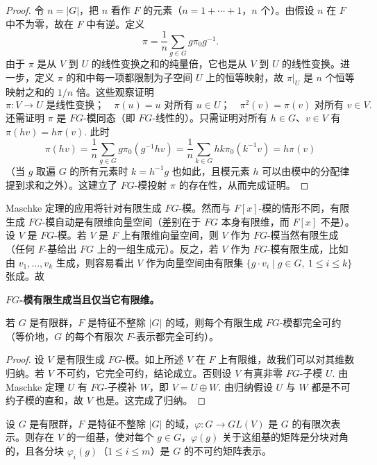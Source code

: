 \begin{proof}
令 \(n = |G|\)，把 \(n\) 看作 \(F\) 的元素（\(n = 1+\cdots+1\)，\(n\) 个）。由假设 \(n\) 在 \(F\) 中不为零，故在 \(F\) 中有逆。定义
\[
\pi = \frac{1}{n}\sum_{g \in G}g\pi_0g^{-1}.
\]
由于 \(\pi\) 是从 \(V\) 到 \(U\) 的线性变换之和的纯量倍，它也是从 \(V\) 到 \(U\) 的线性变换。进一步，定义 \(\pi\) 的和中每一项都限制为子空间 \(U\) 上的恒等映射，故 \(\pi|_U\) 是 \(n\) 个恒等映射之和的 \(1/n\) 倍。这些观察证明
\[
\pi : V \to U \text{ 是线性变换；} \quad \pi(u) = u \text{ 对所有 } u \in U； \quad \pi^2(v) = \pi(v) \text{ 对所有 } v \in V.
\]
还需证明 \(\pi\) 是 \(FG\)-模同态（即 \(FG\)-线性的）。只需证明对所有 \(h \in G\)、\(v \in V\) 有 \(\pi(hv) = h\pi(v)\). 此时
\[
\pi(hv) = \frac{1}{n}\sum_{g \in G}g\pi_0(g^{-1}hv) = \frac{1}{n}\sum_{k \in G}hk\pi_0(k^{-1}v) = h\pi(v)
\]
（当 \(g\) 取遍 \(G\) 的所有元素时 \(k = h^{-1}g\) 也如此，且模元素 \(h\) 可以由模中的分配律提到求和之外）。这建立了 \(FG\)-模投射 \(\pi\) 的存在性，从而完成证明。
\end{proof}

Maschke 定理的应用将针对有限生成 \(FG\)-模。然而与 \(F[x]\)-模的情形不同，有限生成 \(FG\)-模自动是有限维向量空间（差别在于 \(FG\) 本身有限维，而 \(F[x]\) 不是）。设 \(V\) 是 \(FG\)-模。若 \(V\) 是 \(F\) 上有限维向量空间，则 \(V\) 作为 \(FG\)-模当然有限生成（任何 \(F\)-基给出 \(FG\) 上的一组生成元）。反之，若 \(V\) 作为 \(FG\)-模有限生成，比如由 \(v_1, \ldots, v_k\) 生成，则容易看出 \(V\) 作为向量空间由有限集 \(\{g \cdot v_i \mid g \in G,\ 1 \leq i \leq k\}\) 张成。故

\noindent\textbf{\(FG\)-模有限生成当且仅当它有限维。}

\begin{corollary}\label{cor:18.2}
若 \(G\) 是有限群，\(F\) 是特征不整除 \(|G|\) 的域，则每个有限生成 \(FG\)-模都完全可约（等价地，\(G\) 的每个有限次 \(F\)-表示都完全可约）。
\end{corollary}

\begin{proof}
设 \(V\) 是有限生成 \(FG\)-模。如上所述 \(V\) 在 \(F\) 上有限维，故我们可以对其维数归纳。若 \(V\) 不可约，它完全可约，结论成立。否则设 \(V\) 有真非零 \(FG\)-子模 \(U\). 由 Maschke 定理 \(U\) 有 \(FG\)-子模补 \(W\)，即 \(V = U \oplus W\). 由归纳假设 \(U\) 与 \(W\) 都是不可约子模的直和，故 \(V\) 也是。这完成了归纳。
\end{proof}

\begin{corollary}\label{cor:18.3}
设 \(G\) 是有限群，\(F\) 是特征不整除 \(|G|\) 的域，\(\varphi : G \to GL(V)\) 是 \(G\) 的有限次表示。则存在 \(V\) 的一组基，使对每个 \(g \in G\)，\(\varphi(g)\) 关于这组基的矩阵是分块对角的，且各分块 \(\varphi_i(g)\)（\(1 \leq i \leq m\)）是 \(G\) 的不可约矩阵表示。
\end{corollary}


